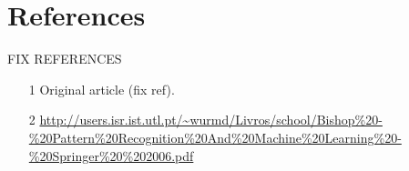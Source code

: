 \section{References}

FIX REFERENCES
\begin{itemize}
\item [1] Original article (fix ref).
\item [2] \url{http://users.isr.ist.utl.pt/~wurmd/Livros/school/Bishop%20-%20Pattern%20Recognition%20And%20Machine%20Learning%20-%20Springer%20%202006.pdf}
\end{itemize}